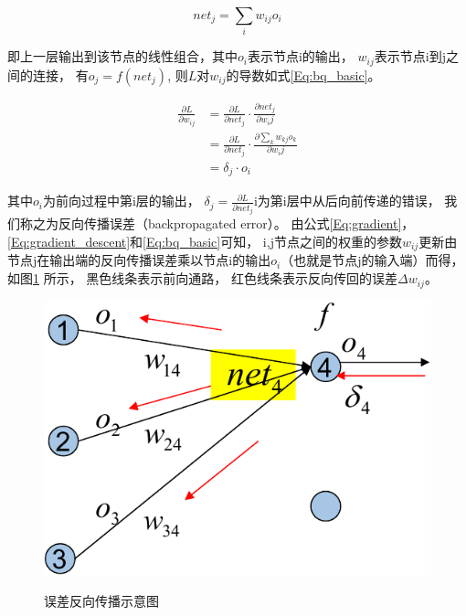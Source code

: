 \begin{equation}
	net_j = \sum_i{w_{ij}o_i}
\end{equation}

即上一层输出到该节点的线性组合，其中$o_i$表示节点i的输出， $w_{ij}$表示节点i到j之间的连接， 有$o_{j} = f(net_j)$, 则$L$对$w_{ij}$的导数如式\ref{Eq:bq_basic}。


\begin{equation}\label{Eq:bq_basic}
\begin{split}
\frac{\partial L}{\partial w_{ij}} 
&= \frac{\partial L}{\partial net_j}\cdot \frac{\partial net_j}{\partial w_ij}\\
&= \frac{\partial L}{\partial net_j}\cdot \frac{\partial \sum_k{w_{kj}o_k}}{\partial w_ij}\\
&= \delta_{j}\cdot o_i
\end{split}
\end{equation}

其中$o_i$为前向过程中第i层的输出， $\delta_j = \frac{\partial L}{\partial net_j}$i为第i层中从后向前传递的错误， 我们称之为反向传播误差（backpropagated error）。 由公式\ref{Eq:gradient}，\ref{Eq:gradient_descent}和\ref{Eq:bq_basic}可知， i,j节点之间的权重的参数$w_{ij}$更新由节点j在输出端的反向传播误差乘以节点i的输出$o_i$（也就是节点j的输入端）而得， 如图\ref{fig:update_weight} 所示， 黑色线条表示前向通路， 红色线条表示反向传回的误差$\Delta w_{ij}$。

\begin{figure}[htb]
  \centering
  \includegraphics[scale=0.8]{Pictures/CNN/weight_update-crop.pdf}\\
  \caption{误差反向传播示意图}\label{fig:update_weight}
\end{figure}


